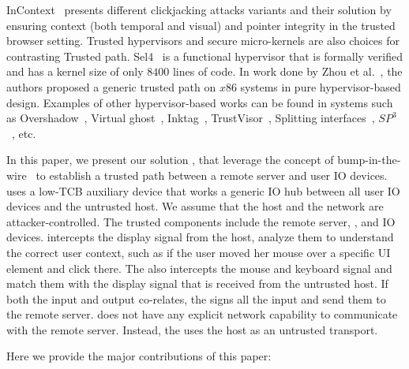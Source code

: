 InContext~\cite{huang2012clickjacking} presents different clickjacking attacks variants and their solution by ensuring context (both temporal and visual) and pointer integrity in the trusted browser setting. Trusted hypervisors and secure micro-kernels are also choices for contrasting Trusted path. Sel4~\cite{klein2009sel4} is a functional hypervisor that is formally verified and has a kernel size of only $8400$ lines of code. In work done by Zhou et al.~\cite{zhou2012building}, the authors proposed a generic trusted path on $x86$ systems in pure hypervisor-based design. Examples of other hypervisor-based works can be found in systems such as Overshadow~\cite{Overshadow}, Virtual ghost~\cite{criswell2014virtual}, Inktag~\cite{hofmann2013inktag}, TrustVisor~\cite{mccune2010trustvisor}, Splitting interfaces~\cite{ta2006splitting}, $SP^3$~\cite{yang2008using}, etc.


 In this paper, we present our solution \name, that leverage the concept of bump-in-the-wire~\cite{McCPerRei2006} to establish a trusted path between a remote server and user IO devices. \name uses a low-TCB auxiliary device that works a generic IO hub between all user IO devices and the untrusted host. 
We assume that the host and the network are attacker-controlled. The trusted components include the remote server, \device, and IO devices. \device intercepts the display signal from the host, analyze them to understand the correct user context, such as if the user moved her mouse over a specific UI element and click there. The \device also intercepts the mouse and keyboard signal and match them with the display signal that is received from the untrusted host. If both the input and output co-relates, the \device signs all the input and send them to the remote server. \device does not have any explicit network capability to communicate with the remote server. Instead, the \device uses the host as an untrusted transport.

 Here we provide the major contributions of this paper:
\begin{mylist}
  \item
\end{mylist}

